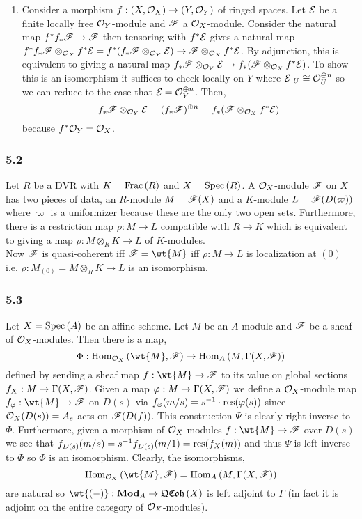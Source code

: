 \documentclass[12pt]{article}
\begin{document}
\begin{enumerate}
\item Consider a morphism $f : (X, \mathcal{O}_{X}) \to (Y, \mathcal{O}_{Y})$ of ringed spaces. Let $\mathcal{E}$ be a finite locally free $\mathcal{O}_{Y}$-module and $\mathscr{F}$ a $\mathcal{O}_{X}$-module. Consider the natural map $f^* f_* \mathscr{F} \to \mathscr{F}$ then tensoring with $f^* \mathcal{E}$ gives a natural map $f^* f_* \mathscr{F} \otimes_{\mathcal{O}_{X}} f^* \mathcal{E} = f^*(f_* \mathscr{F} \otimes_{\mathcal{O}_{Y}} \mathcal{E}) \to \mathscr{F} \otimes_{\mathcal{O}_{X}} f^* \mathcal{E}$. By adjunction, this is equivalent to giving a natural map $f_* \mathscr{F} \otimes_{\mathcal{O}_{Y}} \mathcal{E} \to f_*(\mathscr{F} \otimes_{\mathcal{O}_{X}} f^* \mathcal{E})$. To show this is an isomorphism it suffices to check locally on $Y$ where $\mathcal{E}|_U \cong \mathcal{O}_{U}^{\oplus n}$ so we can reduce to the case that $\mathcal{E} = \mathcal{O}_{Y}^{\oplus n}$. Then,
\[ f_* \mathscr{F} \otimes_{\mathcal{O}_{Y}} \mathcal{E} = (f_* \mathscr{F})^{\oplus n} = f_* (\mathscr{F} \otimes_{\mathcal{O}_{X}} f^* \mathcal{E}) \]
because $f^* \mathcal{O}_{Y} = \mathcal{O}_{X}$.
\end{enumerate}

\subsubsection{5.2}

Let $R$ be a DVR with $K = \mathrm{Frac}\left(R\right)$ and $X = \mathrm{Spec}\left( R \right)$. A $\mathcal{O}_{X}$-module $\mathscr{F}$ on $X$ has two pieces of data, an $R$-module $M = \mathscr{F}(X)$ and a $K$-module $L = \mathscr{F}(D(\varpi))$ where $\varpi$ is a uniformizer because these are the only two open sets. Furthermore, there is a restriction map $\rho : M \to L$ compatible with $R \to K$ which is equivalent to giving a map $\rho : M \otimes_R K \to L$ of $K$-modules.
\bigskip\\
Now $\mathscr{F}$ is quasi-coherent iff $\F = \wt{M}$ iff $\rho : M \to L$ is localization at $(0)$ i.e. $\rho : M_{(0)} = M \otimes_R K \to L$ is an isomorphism. 

\subsubsection{5.3}

Let $X = \mathrm{Spec}\left( A \right)$ be an affine scheme. Let $M$ be an $A$-module and $\mathscr{F}$ be a sheaf of $\mathcal{O}_{X}$-modules. Then there is a map,
\[ \Phi : \Hom{\struct{X}}{\wt{M}}{\F} \to \Hom{A}{M}{\Gamma(X, \F)} \]
defined by sending a sheaf map $f : \wt{M} \to \F$ to its value on global sections $f_X : M \to \Gamma(X, \mathscr{F})$. Given a map $\varphi : M \to \Gamma(X, \mathscr{F})$ we define a $\mathcal{O}_{X}$-module map $f_\varphi : \wt{M} \to \F$ on $D(s)$ via $f_{\varphi}(m/s) = s^{-1} \cdot \mathrm{res}(\varphi(s))$ since $\mathcal{O}_{X}(D(s)) = A_s$ acts on $\mathscr{F}(D(f))$. This construction $\Psi$ is clearly right inverse to $\Phi$. Furthermore, given a morphism of $\mathcal{O}_{X}$-modules $f : \wt{M} \to \F$ over $D(s)$ we see that $f_{D(s)}(m/s) = s^{-1} f_{D(s)}(m/1) = \mathrm{res}(f_X(m))$ and thus $\Psi$ is left inverse to $\Phi$ so $\Phi$ is an isomorphism. Clearly, the isomorphisms,
\[ \Hom{\struct{X}}{\wt{M}}{\F} = \Hom{A}{M}{\Gamma(X, \F)} \]
are natural so $\wt{(-)} : \Mod{A} \to \QCoh{X}$ is left adjoint to $\Gamma$ (in fact it is adjoint on the entire category of $\mathcal{O}_{X}$-modules).
\end{document}
